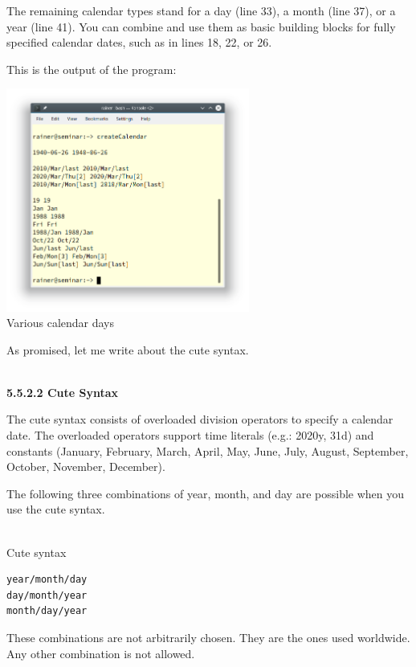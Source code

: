 The remaining calendar types stand for a day (line 33), a month (line 37), or a year (line 41). You can combine and use them as basic building blocks for fully specified calendar dates, such as in lines 18, 22, or 26.

This is the output of the program:

\begin{center}
\includegraphics[width=0.6\textwidth]{content/3/chapter5/images/20.png}\\
Various calendar days
\end{center}

As promised, let me write about the cute syntax.

\hspace*{\fill} \\ %
\noindent
\textbf{5.5.2.2\hspace{0.2cm} Cute Syntax}

The cute syntax consists of overloaded division operators to specify a calendar date. The overloaded operators support time literals (e.g.: 2020y, 31d) and constants (January, February, March, April, May, June, July, August, September, October, November, December).

The following three combinations of year, month, and day are possible when you use the cute syntax.

\hspace*{\fill} \\ %
\noindent
Cute syntax
\begin{lstlisting}[style=styleCXX]
year/month/day
day/month/year
month/day/year
\end{lstlisting}

These combinations are not arbitrarily chosen. They are the ones used worldwide. Any other combination is not allowed.

